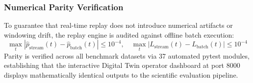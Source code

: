 \documentclass[12pt,a4paper]{article}
\begin{document}
\subsubsection*{Numerical Parity Verification}
To guarantee that real-time replay does not introduce numerical artifacts or windowing drift, the replay engine is audited against offline batch execution:
\begin{equation}
\max_{t} | \hat{p}_{\text{stream}}(t) - \hat{p}_{\text{batch}}(t) | \le 10^{-4}, \quad \max_{t} | L_{\text{stream}}(t) - L_{\text{batch}}(t) | \le 10^{-4}
\end{equation}
Parity is verified across all benchmark datasets via 37 automated pytest modules, establishing that the interactive Digital Twin operator dashboard at port 8000 displays mathematically identical outputs to the scientific evaluation pipeline.
\end{document}
